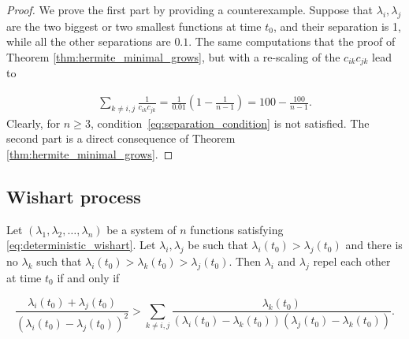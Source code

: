 \begin{proof}
    We prove the first part by providing a counterexample. Suppose that $\lambda_i,\lambda_j$ are the two biggest or two smallest functions at time $t_0$, and their separation is 1, while all the other separations are $0.1$. The same computations that the proof of Theorem \ref{thm:hermite_minimal_grows}, but with a re-scaling of the $c_{ik}c_{jk}$ lead to

    \begin{align*}
        \sum_{k\neq i,j} \frac{1}{c_{ik}c_{jk}} = \frac{1}{0.01}\left( 1 - \frac1{n-1}\right) = 100 - \frac{100}{n-1}.
    \end{align*} Clearly, for $n\ge 3$, condition~\eqref{eq:separation_condition} is not satisfied. The second part is a direct consequence of Theorem \ref{thm:hermite_minimal_grows}.
\end{proof}

\subsection{Wishart process}

\begin{lemma} \label{lemma:separating_condition_wishart}
    Let $(\lambda_1, \lambda_2, \dots, \lambda_n)$ be a system of $n$ functions satisfying \eqref{eq:deterministic_wishart}. Let $\lambda_i, \lambda_j$ be such that $\lambda_i(t_0) > \lambda_j(t_0)$ and there is no $\lambda_k$ such that $\lambda_i(t_0) > \lambda_k(t_0) > \lambda_j(t_0)$. Then $\lambda_i$ and $\lambda_j$ repel each other at time $t_0$ if and only if 

    \begin{equation} \label{eq:separation_condition_wishart}
        \frac{\lambda_i(t_0) + \lambda_j(t_0)}{(\lambda_i(t_0) - \lambda_j(t_0))^2} > \sum_{k\neq i,j} \frac{\lambda_k(t_0)}{(\lambda_i(t_0)-\lambda_k(t_0))(\lambda_j(t_0)-\lambda_k(t_0))}.
    \end{equation}
\end{lemma}


